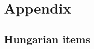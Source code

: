 \documentclass[11pt]{article}
\begin{document}









%


\appendix

\section*{Appendix}
\label{sec:appendix}

\subsection*{Hungarian items}\label{hungarian_items}
\end{document}
